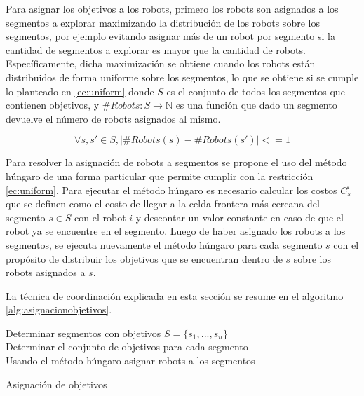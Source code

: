 Para asignar los objetivos a los robots, primero los robots son asignados a los
segmentos a explorar maximizando la distribución de los robots sobre
los segmentos, por ejemplo evitando asignar más de un robot por segmento si la
cantidad de segmentos a explorar es mayor que la cantidad de robots. Específicamente, dicha
maximización se obtiene cuando los robots están distribuidos de forma uniforme
sobre los segmentos, lo que se obtiene si se cumple lo planteado en
\eqref{ec:uniform} donde $S$ es el conjunto de todos los segmentos que
contienen objetivos, y $\#Robots : S \rightarrow \mathds{N}$ es una función que
dado un segmento devuelve el número de robots asignados al mismo. 

\begin{equation}\label{ec:uniform}
  \forall s,s' \in S, |\#Robots(s) - \#Robots(s')| <= 1
\end{equation}

Para resolver la asignación de robots a segmentos se propone el uso del método húngaro
\cite{kuhn1955hungarian} de una forma particular que permite cumplir con la
restricción \eqref{ec:uniform}. Para ejecutar el método húngaro es necesario
calcular los costos $C_{s}^{i}$ que se definen como el costo de llegar a la
celda frontera más cercana del segmento $s \in S$ con el robot $i$ y
descontar un valor constante en caso de que el robot ya se encuentre en el
segmento. Luego de haber asignado los robots a los segmentos, se ejecuta
nuevamente el método húngaro para cada segmento $s$ con el propósito de distribuir
los objetivos que se encuentran dentro de $s$ sobre los robots asignados a $s$.

La técnica de coordinación explicada en esta sección se resume en el algoritmo \ref{alg:asignacionobjetivos}.

\begin{algorithm}[H]
\SetAlgoLined
    Determinar segmentos con objetivos $S = \{s_{1} , ..., s_{n} \}$ \\
    Determinar el conjunto de objetivos para cada segmento\\
    Usando el método húngaro asignar robots a los segmentos \\
    \caption{Asignación de objetivos}
    \label{alg:asignacionobjetivos}
\end{algorithm}

